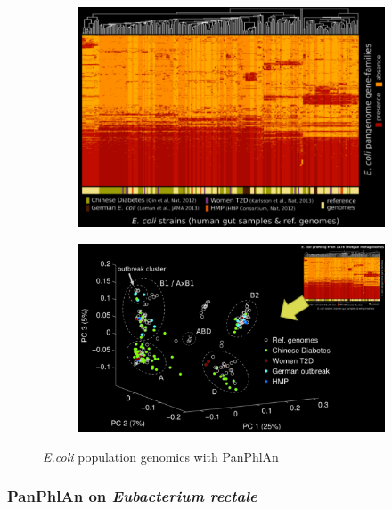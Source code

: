 \begin{figure}[!h]
\centering
\begin{subfigure}{.49\textwidth}
    \centering
    \includegraphics[width=\linewidth]{Ecoli1.png}
    \caption{\label{fig:Ecoli1}}
\end{subfigure}
%
\begin{subfigure}{.49\textwidth}
    \centering
    \includegraphics[width=\linewidth]{Ecoli2.png}
    \caption{\label{fig:Ecoli2}}
\end{subfigure}
\caption{\emph{E.coli} population genomics with PanPhlAn}
\end{figure}

\vspace{2cm}

\subsubsection{PanPhlAn on \emph{Eubacterium rectale}}

